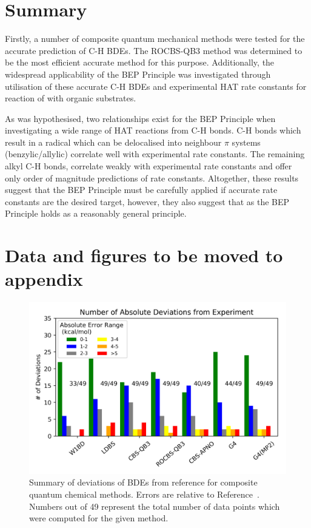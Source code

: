 
\section{Summary}

Firstly, a number of composite quantum mechanical methods were tested for the accurate prediction of C-H BDEs. The ROCBS-QB3 method was determined to be the most efficient accurate method for this purpose. Additionally, the widespread applicability of the BEP Principle was investigated through utilisation of these accurate C-H BDEs and experimental HAT rate constants for reaction of \cumo with organic substrates.

As was hypothesised, two relationships exist for the BEP Principle when investigating a wide range of HAT reactions from C-H bonds. C-H bonds which result in a radical which can be delocalised into neighbour $\pi$ systems (benzylic/allylic) correlate well with experimental rate constants. The remaining alkyl C-H bonds, correlate weakly with experimental rate constants and offer only order of magnitude predictions of rate constants. Altogether, these results suggest that the BEP Principle must be carefully applied if accurate rate constants are the desired target, however, they also suggest that as the BEP Principle holds as a reasonably general principle.

\newpage
\section{Data and figures to be moved to appendix}
\begin{figure}[htb]
  \centering
  \includegraphics[width=\textwidth]{figures/bde-mae-barchart}
  \caption[Summary of deviations of BDEs from reference for composite quantum chemical methods.]{Summary of deviations of BDEs from reference for composite quantum chemical methods. Errors are relative to Reference~\protect{}. Numbers out of 49 represent the total number of data points which were computed for the given method.}
\end{figure}


